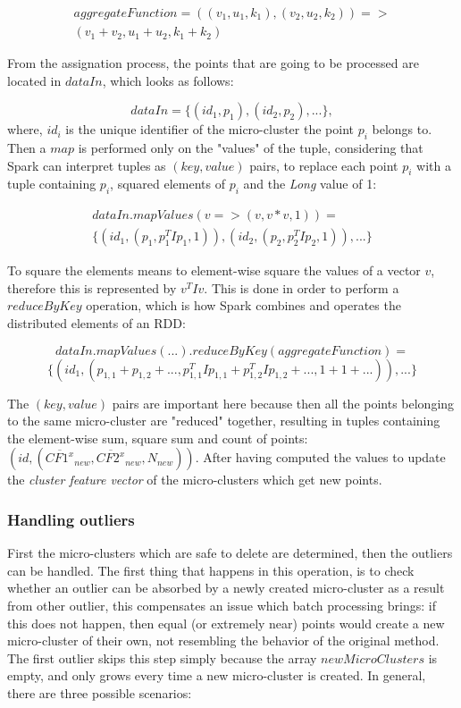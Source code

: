 \documentclass[10pt, conference, compsocconf]{IEEEtran}
\begin{document}
\begin{gather*}
aggregateFunction =  ((v_1 , u_1 , k_1 ) ,  (v_2 , u_2 , k_2 )) => \\
(v_1 + v_2 , u_1 + u_2 , k_1 + k_2) 
\end{gather*}


From the assignation process, the points that are going to be processed are located in $dataIn$, which looks as follows:

$$dataIn=\{(id_1,p_1),(id_2,p_2),...\},$$ 
where, $id_i$ is the unique identifier of the micro-cluster the point $p_i$ belongs to. Then a $map$ is performed only on the "values" of the tuple, considering that Spark can interpret tuples as $(key,value)$ pairs, to replace each point $p_i$ with a tuple containing $p_i$, squared elements of $p_i$ and the \textit{Long} value of 1: 

\begin{gather*}
dataIn.mapValues( v => (v, v * v, 1) ) = \\
\{ (id_1, (p_1 , p_1^T I p_1 , 1) ) , (id_2 , (p_2 , p_2^T I p_2 , 1) ) ,... \}
\end{gather*}

To square the elements means to element-wise square the values of a vector $v$, therefore this is represented by $v^TIv$. This is done in order to perform a $reduceByKey$ operation, which is how Spark combines and operates the distributed elements of an RDD:

$$dataIn.mapValues(...).reduceByKey(aggregateFunction) =$$
$$\{ (id_1, (p_{1,1} + p_{1,2} + ... , p_{1,1}^T I p_{1,1} + p_{1,2}^T I p_{1,2}  +...  , 1 + 1 + ...) ), ... \}$$

The $(key,value)$ pairs are important here because then all the points belonging to the same micro-cluster are "reduced" together, resulting in tuples containing the element-wise sum, square sum and count of points: $(id,(\overline{CF1^x}_{new}, \overline{CF2^x}_{new}, N_{new}))$. After having computed the values to update the \textit{cluster feature vector} of the micro-clusters which get new points.


\subsubsection{Handling outliers}\label{handlingoutliers}


First the micro-clusters which are safe to delete are determined, then the outliers can be handled. The first thing that happens in this operation, is to check whether an outlier can be absorbed by a newly created micro-cluster as a result from other outlier, this compensates an issue which batch processing brings: if this does not happen, then equal (or extremely near) points would create a new micro-cluster of their own, not resembling the behavior of the original method. The first outlier skips this step simply because the array $newMicroClusters$ is empty, and only grows every time a new micro-cluster is created. In general, there are three possible scenarios:
\end{document}
